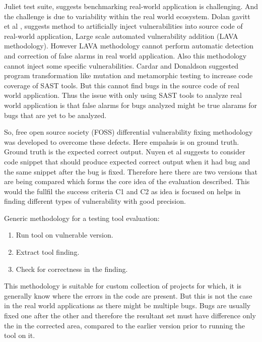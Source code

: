 \documentclass[authoryear,preprint]{sigplanconf}
\begin{document}
Juliet test suite, suggests benchmarking real-world application is challenging. And the challenge is due to variability within the real world ecosystem. Dolan gavitt et al \cite{7546498}, suggests method to artificially inject vulnerabilities into source code of real-world application, Large scale automated vulnerability addition (LAVA methodology). However LAVA methodology cannot perform automatic detection and correction of false alarms in real world application. Also this methodology cannot inject some specific vulnerabilities. Cardar and Donaldson \cite{Cadar:2016:APA:2889160.2889206} suggested program transformation like mutation and metamorphic testing to increase code coverage of SAST tools. But this cannot find bugs in the source code of  real world application. Thus the issue with only using SAST tools to analyze real world application is that false alarms for bugs analyzed might be true alarams for bugs that are yet to be analyzed.

So, free open source society (FOSS) \cite{Pashchenko:2017:FVD:3106237.3121276} differential vulnerability fixing methodology was developed to overcome these defects. Here empahsis is on ground truth. Ground truth is the expected correct output. Nuyen et al \cite{Do:2016:TAB:2931021.2931023} suggests to consider code snippet that should produce expected correct output when it had bug and the same snippet after the bug is fixed. Therefore here there are two versions that are being compared which forms the core idea of the evaluation described. This would the fullfil the success criteria C1 and C2 as idea is focused on helps in finding different types of vulnerability with good precision.

Generic methodology for a testing tool evaluation: 
\begin{enumerate}
	\item Run tool on vulnerable version.
	\item Extract tool finding.
	\item Check for correctness in the finding.
\end{enumerate}

This methodology is suitable for custom collection of projects for which, it is generally know where the errors in the code are present. But this is not the case in the real world applications as there might be multiple bugs. Bugs are usually fixed one after the other and therefore the resultant set must have difference only the in the corrected area, compared to the earlier version prior to running the tool on it. 
\end{document}
